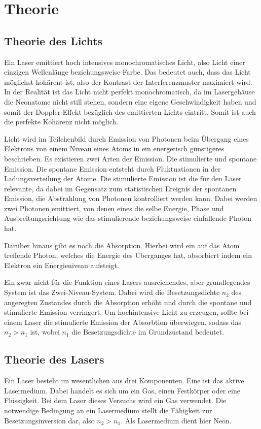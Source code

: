 \section{Theorie}
\subsection{Theorie des Lichts}
Ein Laser emittiert hoch intensives monochromatisches Licht, also Licht einer einzigen Wellenlänge beziehungsweise Farbe. Das bedeutet auch, dass das Licht möglichst kohärent ist, also der Kontrast der Interferenzmuster maximiert wird. In der Realität ist das Licht nicht perfekt monochromatisch, da im Lasergehäuse die Neonatome nicht still stehen, sondern eine eigene Geschwindigkeit haben und somit der Doppler-Effekt bezüglich des emittierten Lichts eintritt. Somit ist auch die perfekte Kohärenz nicht möglich.

\noindent Licht wird im Teilchenbild durch Emission von Photonen beim Übergang eines Elektrons von einem Niveau eines Atoms in ein energetisch günstigeres beschrieben. Es existieren zwei Arten der Emission. Die stimulierte und spontane Emission. Die spontane Emission entsteht durch Fluktuationen in der Ladungsverteilung der Atome. Die stimulierte Emission ist die für den Laser relevante, da dabei im Gegensatz zum statistischen Ereignis der spontanen Emission, die Abstrahlung von Photonen kontrolliert werden kann. Dabei werden zwei Photonen emittiert, von denen eines die selbe Energie, Phase und Ausbreitungsrichtung wie das stimulierende beziehungsweise einfallende Photon hat.

\noindent Darüber hinaus gibt es noch die Absorption. Hierbei wird ein auf das Atom treffende Photon, welches die Energie des Überganges hat, absorbiert indem ein Elektron ein Energieniveau aufsteigt.

\noindent Ein zwar nicht für die Funktion eines Lasers ausreichendes, aber grundlegendes System ist das Zwei-Niveau-System. Dabei wird die Besetzungsdichte \(n_2\) des angeregten Zustandes durch die Absorption erhöht und durch die spontane und stimulierte Emission verringert. Um hochintensive Licht zu erzeugen, sollte bei einem Laser die stimulierte Emission der Absorbtion überwiegen, sodass das \(n_2>n_1\) ist, wobei \(n_1\) die Besetzungsdichte im Grundzustand bedeutet.

\subsection{Theorie des Lasers}
Ein Laser besteht im wesentlichen aus drei Komponenten. Eine ist das aktive Lasermedium. Dabei handelt es sich um ein Gas, einen Festkörper oder eine Flüssigkeit. Bei dem Laser dieses Versuchs wird ein Gas verwendet. Die notwendige Bedingung an ein Lasermedium stellt die Fähigkeit zur Besetzungsinversion dar, also \(n_2>n_1\). Als Lasermedium dient hier Neon.

